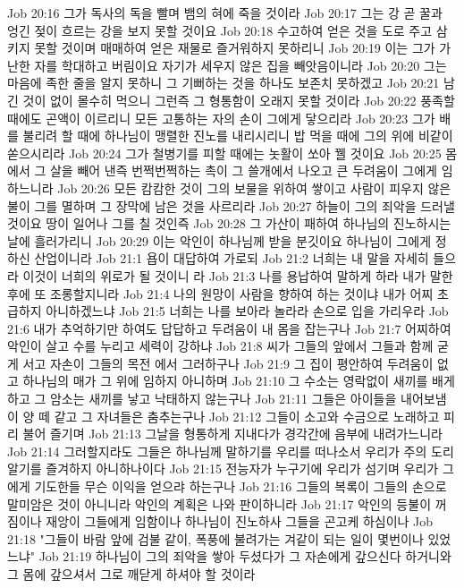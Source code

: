 Job 20:16  그가 독사의 독을 빨며 뱀의 혀에 죽을 것이라
Job 20:17  그는 강 곧 꿀과 엉긴 젖이 흐르는 강을 보지 못할 것이요
Job 20:18  수고하여 얻은 것을 도로 주고 삼키지 못할 것이며 매매하여 얻은 재물로 즐거워하지 못하리니
Job 20:19  이는 그가 가난한 자를 학대하고 버림이요 자기가 세우지 않은 집을 빼앗음이니라
Job 20:20  그는 마음에 족한 줄을 알지 못하니 그 기뻐하는 것을 하나도 보존치 못하겠고
Job 20:21  남긴 것이 없이 몰수히 먹으니 그런즉 그 형통함이 오래지 못할 것이라
Job 20:22  풍족할 때에도 곤액이 이르리니 모든 고통하는 자의 손이 그에게 닿으리라
Job 20:23  그가 배를 불리려 할 때에 하나님이 맹렬한 진노를 내리시리니 밥 먹을 때에 그의 위에 비같이 쏟으시리라
Job 20:24  그가 철병기를 피할 때에는 놋활이 쏘아 꿸 것이요
Job 20:25  몸에서 그 살을 빼어 낸즉 번쩍번쩍하는 촉이 그 쓸개에서 나오고 큰 두려움이 그에게 임하느니라
Job 20:26  모든 캄캄한 것이 그의 보물을 위하여 쌓이고 사람이 피우지 않은 불이 그를 멸하며 그 장막에 남은 것을 사르리라
Job 20:27  하늘이 그의 죄악을 드러낼 것이요 땅이 일어나 그를 칠 것인즉
Job 20:28  그 가산이 패하여 하나님의 진노하시는 날에 흘러가리니
Job 20:29  이는 악인이 하나님께 받을 분깃이요 하나님이 그에게 정하신 산업이니라
Job 21:1  욥이 대답하여 가로되
Job 21:2  너희는 내 말을 자세히 들으라 이것이 너희의 위로가 될 것이니 라
Job 21:3  나를 용납하여 말하게 하라 내가 말한 후에 또 조롱할지니라
Job 21:4  나의 원망이 사람을 향하여 하는 것이냐 내가 어찌 초급하지 아니하겠느냐
Job 21:5  너희는 나를 보아라 놀라라 손으로 입을 가리우라
Job 21:6  내가 추억하기만 하여도 답답하고 두려움이 내 몸을 잡는구나
Job 21:7  어찌하여 악인이 살고 수를 누리고 세력이 강하냐
Job 21:8  씨가 그들의 앞에서 그들과 함께 굳게 서고 자손이 그들의 목전 에서 그러하구나
Job 21:9  그 집이 평안하여 두려움이 없고 하나님의 매가 그 위에 임하지 아니하며
Job 21:10  그 수소는 영락없이 새끼를 배게 하고 그 암소는 새끼를 낳고 낙태하지 않는구나
Job 21:11  그들은 아이들을 내어보냄이 양 떼 같고 그 자녀들은 춤추는구나
Job 21:12  그들이 소고와 수금으로 노래하고 피리 불어 즐기며
Job 21:13  그날을 형통하게 지내다가 경각간에 음부에 내려가느니라
Job 21:14  그러할지라도 그들은 하나님께 말하기를 우리를 떠나소서 우리가 주의 도리 알기를 즐겨하지 아니하나이다
Job 21:15  전능자가 누구기에 우리가 섬기며 우리가 그에게 기도한들 무슨 이익을 얻으랴 하는구나
Job 21:16  그들의 복록이 그들의 손으로 말미암은 것이 아니니라 악인의 계획은 나와 판이하니라
Job 21:17  악인의 등불이 꺼짐이나 재앙이 그들에게 임함이나 하나님이 진노하사 그들을 곤고케 하심이나
Job 21:18  "그들이 바람 앞에 검불 같이, 폭풍에 불려가는 겨같이 되는 일이 몇번이나 있었느냐"
Job 21:19  하나님이 그의 죄악을 쌓아 두셨다가 그 자손에게 갚으신다 하거니와 그 몸에 갚으셔서 그로 깨닫게 하셔야 할 것이라
